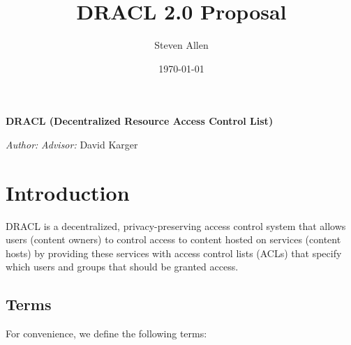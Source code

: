 \documentclass[pdftex,12pt,a4papaer]{report}
\title{DRACL 2.0 Proposal}
\author{Steven Allen}
\date{\today}
\begin{document}
\thispagestyle{plain}

\begin{center}
    \vspace*{\fill}
    {%
        \onehalfspacing{} \bfseries \Large
        DRACL (Decentralized Resource Access Control List) \\
    }

    \vspace{\fill}
    {\large
    \begin{minipage}{0.9\textwidth}
        \emph{Author:} \theauthor{} \hfill \emph{Advisor:} David Karger
        \\
        \begin{center}
              \thedate{}
        \end{center}
    \end{minipage}
    }
    \vspace*{\fill}
\end{center}

\tableofcontents

\newpage

\chapter{Introduction} 

DRACL is a decentralized, privacy-preserving access control system that allows
users (content owners) to control access to content hosted on services (content
hosts) by providing these services with access control lists (ACLs) that specify
which users and groups that should be granted access.


\section{Terms}

For convenience, we define the following terms:
\end{document}
